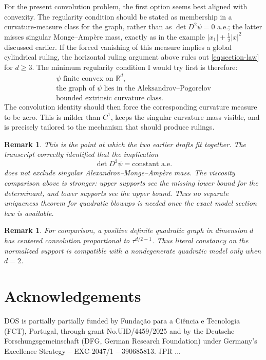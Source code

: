\documentclass[11pt]{amsart}
\def\R{\mathbb{R}}
\newtheorem{remark}[theorem]{Remark}
\begin{document}
For the present convolution problem, the first option seems best aligned with
convexity.  The regularity condition should be stated as membership in a
curvature-measure class for the graph, rather than as
$\det D^2\psi=0$ a.e.; the latter misses singular Monge--Ampère mass, exactly
as in the example $|x_1|+\frac12|x|^2$ discussed earlier.  If the forced
vanishing of this measure implies a global cylindrical ruling, the horizontal
ruling argument above rules out \eqref{eq:section-law} for $d\geq3$.  The
minimum regularity condition I would try first is therefore:
\[
\begin{gathered}
    \psi \text{ finite convex on }\R^d,\\
    \text{the graph of }\psi\text{ lies in the Aleksandrov--Pogorelov}\\
    \text{bounded extrinsic curvature class}.
\end{gathered}
\]
The convolution identity should then force the corresponding curvature measure
to be zero.  This is milder than $C^1$, keeps the singular curvature mass
visible, and is precisely tailored to the mechanism that should produce
rulings.

\begin{remark}
This is the point at which the two earlier drafts fit together.  The transcript
correctly identified that the implication
\[
    \det D^2\psi=\text{constant a.e.}
\]
does not exclude singular Alexandrov--Monge--Ampère mass.  The viscosity
comparison above is stronger: upper supports see the missing lower bound for
the determinant, and lower supports see the upper bound.  Thus no separate
uniqueness theorem for quadratic blowups is needed once the exact model
section law is available.
\end{remark}

\begin{remark}
For comparison, a positive definite quadratic graph in dimension $d$ has
centered convolution proportional to $\tau^{d/2-1}$.  Thus literal constancy
on the normalized support is compatible with a nondegenerate quadratic model
only when $d=2$.
\end{remark}

\section*{Acknowledgements}
DOS  is partially partially funded by Fundação para a Ciência e Tecnologia (FCT), Portugal, through  grant No.\@ UID/4459/2025 and  by the Deutsche Forschungsgemeinschaft 
 (DFG, German Research Foundation) under Germany's Excellence Strategy -- EXC-2047/1 -- 390685813.
JPR ...
\end{document}
